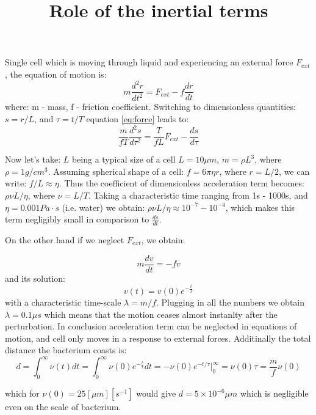 \documentclass{article}
\begin{document}
\title{Role of the inertial terms}

\maketitle

Single cell which is moving through liquid and experiencing an external force $F_{ext}$, the equation of motion is:
\begin{equation}\label{eq:force}
  m \frac{d^2 r}{dt^2} = F_{ext} - f \frac{d r}{d t}
\end{equation}
where: m - mass, f - friction coefficient.
Switching to dimensionless quantities: $s = r/L$, and $\tau=t/T$ equation \ref{eq:force} leads to:
\begin{equation}
 \frac{m}{f T} \frac{d^2 s}{d \tau^2} = \frac{T}{f L} F_{ext} - \frac{ds}{d \tau}
\end{equation}

Now let's take: $L$ being a typical size of a cell $L=10 \mu m$, $m=\rho L^3$, where $\rho = 1g/cm^3$.
Assuming spherical shape of a cell: $f = 6 \pi \eta r$, where $r=L/2$, we can write: $f/L \approx \eta$.
Thus the coefficient of dimensionless acceleration term becomes: $\rho \nu L / \eta$, where $\nu = L/T$. 
Taking a characteristic time ranging from 1s -  1000s, and $\eta=0.001 Pa \cdot s$ (i.e. water) we obtain:
$\rho \nu L / \eta \approx 10^{-7} - 10^{-4}$, which makes this term negligibly small in comparison to
$\frac{d s}{d t}$.

On the other hand if we neglect $F_{ext}$, we obtain:

\begin{equation}
 m \frac{d v}{d t} = -f v
\end{equation}
and its solution:
\begin{equation}
 v(t) = v(0) e^{-\frac{t}{\lambda}}
\end{equation}
with a characteristic time-scale $\lambda=m/f$. Plugging in all the numbers we obtain $\lambda=0.1 \mu s$ 
which means that the motion ceases almost instanlty after the perturbation.
In conclusion acceleration term can be neglected in equations of motion, and cell only moves in a response to external forces. 
Additinally the total distance the bacterium coasts is:
\begin{equation}
 d = \int_{0}^{\infty} \nu(t) dt = \int_{0}^{\infty} \nu(0)e^{-\frac{t}{\tau}} dt = -\nu(0) e^{-t/\tau} | ^{\infty}_{0} = \nu(0) \tau = \frac{m}{f}  \nu(0)
\end{equation}

which for $\nu(0)=25 [\mu m] [s^{-1}]$ would give $d = 5 \times 10^{-6} \mu m$ which is negligible even on the scale of bacterium.
\end{document}
